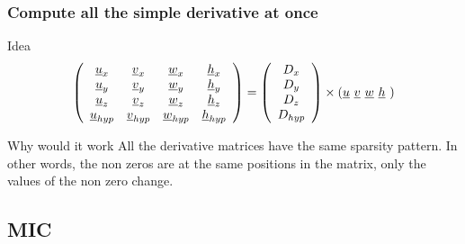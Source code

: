 \documentclass{beamer}
\begin{document}
\begin{frame}
  \frametitle{Compute all the simple derivative at once}

    \begin{block}{Idea}
      \scriptsize
      \begin{equation}
        \left( \begin{array}{cccc}
            \underline{u}_x     & \underline{v}_x     & \underline{w}_x     & \underline{h}_x \\
            \underline{u}_y     & \underline{v}_y     & \underline{w}_y     & \underline{h}_y \\
            \underline{u}_z     & \underline{v}_z     & \underline{w}_z     & \underline{h}_z \\
            \underline{u}_{hyp} & \underline{v}_{hyp} & \underline{w}_{hyp} & \underline{h}_{hyp}
          \end{array} \right)
        = \left(
          \begin{array}{c}
            D_{x}\\ D_{y}\\ D_{z}\\ D_{hyp}
          \end{array}\right)
        \times \left(\underline{u} \,\, \underline{v} \,\, \underline{w} \,\, \underline{h} \,\,\right) 
        \vspace{-1ex}
      \end{equation}
    \end{block}  
    
    \begin{block}{Why would it work}
      All the derivative matrices have the same sparsity pattern. In
      other words, the non zeros are at the same positions in the
      matrix, only the values of the non zero change.
    \end{block}

\end{frame}

\subsection{MIC}
\end{document}
